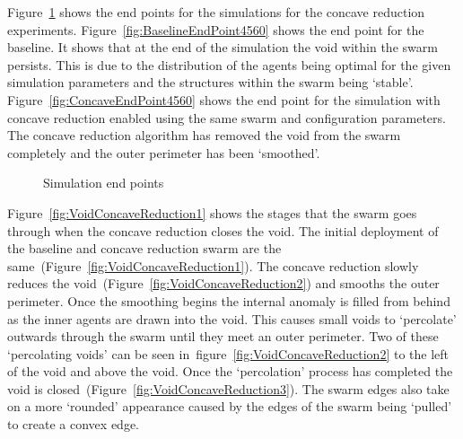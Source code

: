 Figure~\ref{fig:SimulationEndPoints4560} shows the end points for the simulations for the concave reduction experiments. Figure~\ref{fig:BaselineEndPoint4560} shows the end point for the baseline. It shows that at the end of the simulation the void within the swarm persists. This is due to the distribution of the agents being optimal for the given simulation parameters and the structures within the swarm being `stable'. Figure~\ref{fig:ConcaveEndPoint4560} shows the end point for the simulation with concave reduction enabled using the same swarm and configuration parameters. The concave reduction algorithm has removed the void from the swarm completely and the outer perimeter has been `smoothed'. 

\begin{figure}[H]
\centering
\caption{Simulation end points}
\label{fig:SimulationEndPoints4560}
\end{figure} 

Figure~\ref{fig:VoidConcaveReduction1} shows the stages that the swarm goes through when the concave reduction closes the void. The initial deployment of the baseline and concave reduction swarm are the same~(Figure~\ref{fig:VoidConcaveReduction1}). The concave reduction slowly reduces the void~(Figure~\ref{fig:VoidConcaveReduction2}) and smooths the outer perimeter. Once the smoothing begins the internal anomaly is filled from behind as the inner agents are drawn into the void. This causes small voids to `percolate' outwards through the swarm until they meet an outer perimeter. Two of these `percolating voids' can be seen in~figure~\ref{fig:VoidConcaveReduction2} to the left of the void and above the void. Once the `percolation' process has completed the void is closed~(Figure~\ref{fig:VoidConcaveReduction3}). The swarm edges also take on a more `rounded' appearance caused by the edges of the swarm being `pulled' to create a convex edge.

